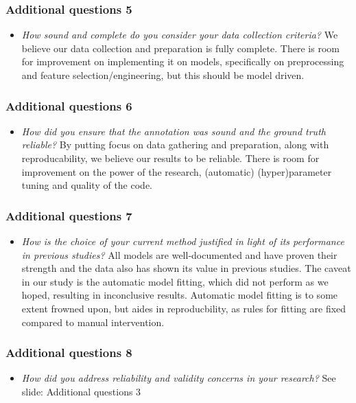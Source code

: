 \documentclass[aspectratio=169,classic]{uva-inf-presentation}
\begin{document}
\begin{frame}
\frametitle{Additional questions 5}
\begin{itemize}
    \item \textit{How sound and complete do you consider your data collection criteria?} \newline
    We believe our data collection and preparation is fully complete. There is room for improvement on implementing it on models, specifically on preprocessing and feature selection/engineering, but this should be model driven.
\end{itemize}
\end{frame}

\begin{frame}
\frametitle{Additional questions 6}
\begin{itemize}
    \item \textit{How did you ensure that the annotation was sound and the ground truth reliable?} \newline
    By putting focus on data gathering and preparation, along with reproducability, we believe our results to be reliable. There is room for improvement on the power of the research, (automatic) (hyper)parameter tuning and quality of the code.
\end{itemize}
\end{frame} 

\begin{frame}
\frametitle{Additional questions 7}
\begin{itemize}
    \item \textit{How is the choice of your current method justified in light of its performance in previous studies?} \newline
    All models are well-documented and have proven their strength and the data also has shown its value in previous studies. The caveat in our study is the automatic model fitting, which did not perform as we hoped, resulting in inconclusive results. Automatic model fitting is to some extent frowned upon, but aides in reproducbility, as rules for fitting are fixed compared to manual intervention.
\end{itemize}
\end{frame} 


\begin{frame}
\frametitle{Additional questions 8}
\begin{itemize}
    \item \textit{How did you address reliability and validity concerns in your research?} \newline
    See slide: Additional questions 3
\end{itemize}
\end{frame} 
\end{document}

